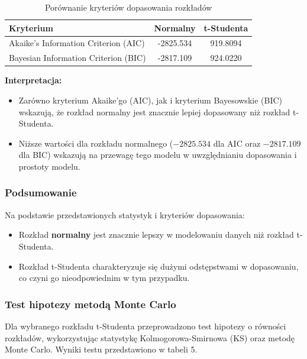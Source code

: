 \documentclass[a4paper,11pt]{article}
\begin{document}
\begin{table}[h!]
\centering
\begin{tabular}{|l|c|c|}
\hline
\textbf{Kryterium}                     & \textbf{Normalny} & \textbf{t-Studenta} \\ \hline
Akaike's Information Criterion (AIC)  & -2825.534         & 919.8094            \\ \hline
Bayesian Information Criterion (BIC)  & -2817.109         & 924.0220            \\ \hline
\end{tabular}
\caption{Porównanie kryteriów dopasowania rozkładów}
\end{table}

\textbf{Interpretacja:}
\begin{itemize}
    \item Zarówno kryterium Akaike'go (AIC), jak i kryterium Bayesowskie (BIC) wskazują, że rozkład normalny jest znacznie lepiej dopasowany niż rozkład t-Studenta.
    \item Niższe wartości dla rozkładu normalnego ($-2825.534$ dla AIC oraz $-2817.109$ dla BIC) wskazują na przewagę tego modelu w uwzględnianiu dopasowania i prostoty modelu.
\end{itemize}

\subsubsection*{Podsumowanie}

Na podstawie przedstawionych statystyk i kryteriów dopasowania:
\begin{itemize}
    \item Rozkład \textbf{normalny} jest znacznie lepszy w modelowaniu danych niż rozkład t-Studenta.
    \item Rozkład t-Studenta charakteryzuje się dużymi odstępstwami w dopasowaniu, co czyni go nieodpowiednim w tym przypadku.
\end{itemize}



\newpage\subsubsection{Test hipotezy metodą Monte Carlo}

Dla wybranego rozkładu t-Studenta przeprowadzono test hipotezy o równości rozkładów, wykorzystując statystykę Kolmogorowa-Smirnowa (KS) oraz metodę Monte Carlo. Wyniki testu przedstawiono w tabeli 5.
\end{document}
